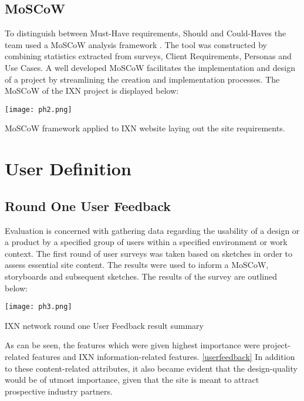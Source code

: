 \documentclass[fontsize=11pt]{extarticle}
\numberwithin{figure}{section} %
\begin{document}
\hypertarget{moscow}{%
\subsection{MoSCoW}\label{moscow}}

To distinguish between Must-Have requirements, Should and Could-Haves
the team used a MoSCoW analysis framework \cite{g4}. The tool was
constructed by combining statistics extracted from surveys, Client
Requirements, Personas and Use Cases. A well developed MoSCoW
facilitates the implementation and design of a project by streamlining
the creation and implementation processes. The MoSCoW of the IXN project
is displayed below:

\newpage

\begin{landscape}
\begin{table}[H]
      \centering
      \texttt{[image: ph2.png]}
      \caption{MoSCoW framework applied to IXN website laying out the site requirements.}
 \end{table}
 \end{landscape}

\hypertarget{user-definition}{%
\section{User Definition}\label{user-definition}}

\hypertarget{round-one-user-feedback}{%
\subsection{Round One User Feedback}\label{round-one-user-feedback}}

Evaluation is concerned with gathering data regarding the usability of a
design or a product by a specified group of users within a specified
environment or work context. The first round of user surveys was taken
based on sketches in order to assess essential site content. The results
were used to inform a MoSCoW, storyboards and subsequent sketches. The
results of the survey are outlined below:

\begin{table}[H]
      \centering
      \texttt{[image: ph3.png]}
      \caption{IXN network round one User Feedback result summary}
\label{userfeedback}
 \end{table}

As can be seen, the features which were given highest importance were
project-related features and IXN information-related features.
\ref{userfeedback} In addition to these content-related attributes, it
also became evident that the design-quality would be of utmost
importance, given that the site is meant to attract prospective industry
partners.
\end{document}
